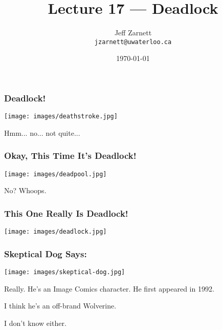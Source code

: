 

\title{Lecture 17 --- Deadlock }

\author{Jeff Zarnett \\ \small \texttt{jzarnett@uwaterloo.ca}}
\date{\today}




\begin{frame}
	\titlepage

\end{frame}


\begin{frame}
	\frametitle{Deadlock!}

	\begin{center}
		\texttt{[image: images/deathstroke.jpg]}
	\end{center}

	Hmm... no... not quite...

\end{frame}


\begin{frame}
	\frametitle{Okay, This Time It's Deadlock!}

	\begin{center}
		\texttt{[image: images/deadpool.jpg]}
	\end{center}

	No? Whoops.

\end{frame}


\begin{frame}
	\frametitle{This One Really Is Deadlock!}

	\begin{center}
		\texttt{[image: images/deadlock.jpg]}
	\end{center}

\end{frame}

\begin{frame}
	\frametitle{Skeptical Dog Says:}

	\begin{center}
		\texttt{[image: images/skeptical-dog.jpg]}
	\end{center}

	Really. He's an Image Comics character. He first appeared in 1992.

	I think he's an off-brand Wolverine.

	I don't know either.


\end{frame}



